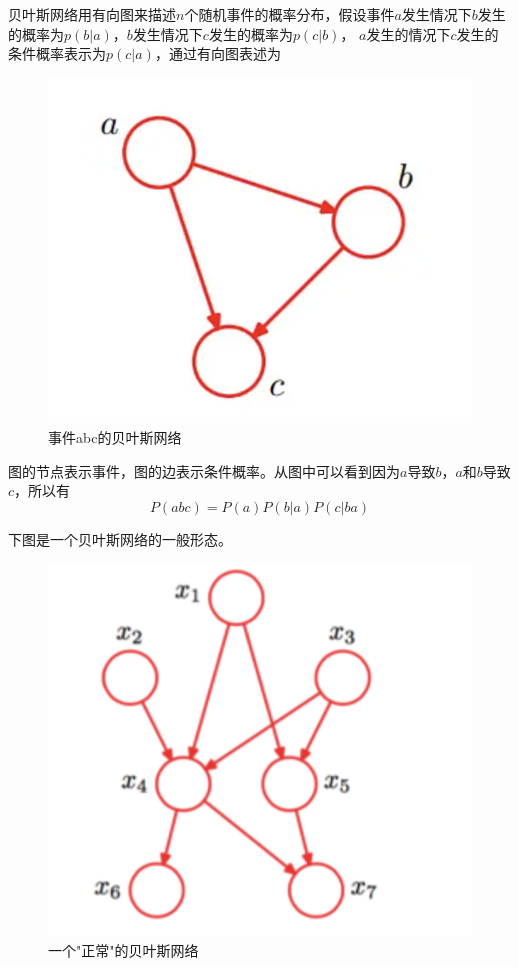 贝叶斯网络用有向图来描述$n$个随机事件的概率分布，假设事件$a$发生情况下$b$发生的概率为$p(b|a)$，$b$发生情况下$c$发生的概率为$p(c|b)$，
$a$发生的情况下$c$发生的条件概率表示为$p(c|a)$，通过有向图表述为
\begin{figure}[H]
    \centering
    \includegraphics[scale=0.2]{figures/abc贝叶斯网络.png}
    \caption{事件abc的贝叶斯网络}
\end{figure}

图的节点表示事件，图的边表示条件概率。从图中可以看到因为$a$导致$b$，$a$和$b$导致$c$，所以有
\begin{equation}
    P(abc)=P(a)P(b|a)P(c|ba)
\end{equation}

下图是一个贝叶斯网络的一般形态。

\begin{figure}[H]
    \centering
    \includegraphics[scale=0.6]{figures/全链接贝叶斯网络.png}
    \caption{一个"正常"的贝叶斯网络}
\end{figure}

